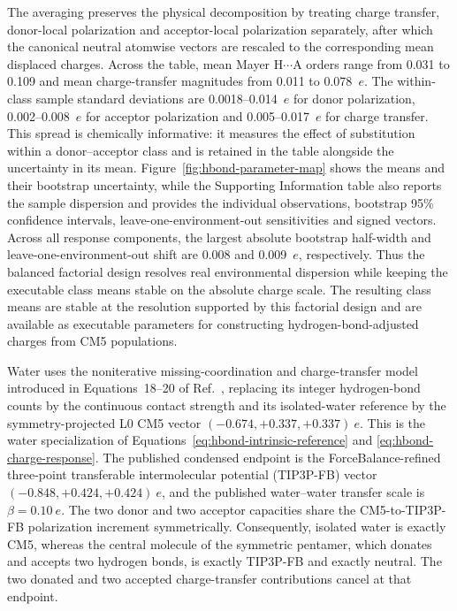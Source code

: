 \documentclass[journal=jctcce,manuscript=article]{achemso}
\begin{document}
The averaging preserves the physical decomposition by treating charge
transfer, donor-local polarization and acceptor-local polarization
separately, after which the canonical neutral atomwise vectors are rescaled to
the corresponding mean displaced charges.  Across the table, mean Mayer
H$\cdots$A orders range from 0.031 to 0.109 and mean charge-transfer
magnitudes from 0.011 to 0.078~$e$.  The within-class sample standard
deviations are 0.0018--0.014~$e$ for donor polarization,
0.002--0.008~$e$ for acceptor polarization and 0.005--0.017~$e$ for
charge transfer.  This spread is chemically informative: it measures the
effect of substitution within a donor--acceptor class and is retained in the
table alongside the uncertainty in its mean.  Figure~\ref{fig:hbond-parameter-map} shows the
means and their bootstrap uncertainty, while the Supporting Information table
also reports the sample dispersion and provides the individual observations,
bootstrap 95\% confidence intervals,
leave-one-environment-out sensitivities and signed vectors.  Across all
response components, the largest absolute bootstrap half-width and
leave-one-environment-out shift are 0.008 and 0.009~$e$, respectively.
Thus the balanced factorial design resolves real environmental dispersion
while keeping the executable class means stable on the absolute charge scale.
The resulting class means are stable at the resolution supported by this
factorial design and are available as executable parameters for constructing
hydrogen-bond-adjusted charges from CM5 populations.

Water uses the noniterative
missing-coordination and charge-transfer model introduced in
Equations~18--20 of Ref.~, replacing its integer
hydrogen-bond counts by the continuous contact strength and its isolated-water
reference by the symmetry-projected L0 CM5 vector
$(-0.674,+0.337,+0.337)~e$.  This is the water specialization of
Equations~\ref{eq:hbond-intrinsic-reference} and
\ref{eq:hbond-charge-response}.  The published condensed endpoint is the
ForceBalance-refined three-point transferable intermolecular potential
(TIP3P-FB) vector $(-0.848,+0.424,+0.424)~e$, and the published
water--water transfer scale is $\beta=0.10~e$.  The two donor and two acceptor
capacities share the CM5-to-TIP3P-FB polarization increment symmetrically.
Consequently, isolated water is exactly CM5, whereas the central molecule of
the symmetric pentamer, which donates and accepts two hydrogen bonds, is
exactly TIP3P-FB and exactly neutral.  The two donated and two accepted
charge-transfer contributions cancel at that endpoint.
\end{document}
